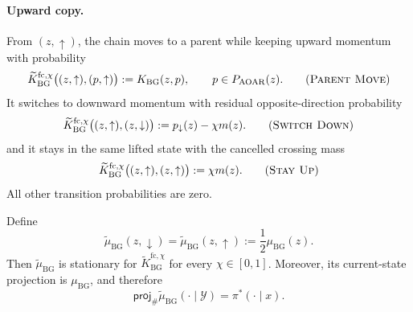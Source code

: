 \documentclass{article}
\numberwithin{theorem}{section}
\numberwithin{proposition}{section}
\numberwithin{corollary}{section}
\numberwithin{lemma}{section}
\numberwithin{conjecture}{section}
\numberwithin{remark}{section}
\numberwithin{definition}{section}
\numberwithin{assumption}{section}
\numberwithin{example}{section}
\newcommand{\calY}{{\mathcal{Y}}}
\begin{document}
\begin{definition}
\paragraph{Upward copy.}
From $(z,\uparrow)$, the chain moves to a parent while keeping upward momentum with probability
\begin{equation*}
    \widetilde K_{\mathrm{BG}}^{\mathrm{fc},\chi}
    \bigl((z,\uparrow),(p,\uparrow)\bigr)
    :=
    K_{\mathrm{BG}}(z,p),\qquad p\in P_{\mathrm{AOAR}}(z).
    \tag{\textsc{Parent Move}}
\end{equation*}
It switches to downward momentum with residual opposite-direction probability
\begin{equation*}
    \widetilde K_{\mathrm{BG}}^{\mathrm{fc},\chi}
    \bigl((z,\uparrow),(z,\downarrow)\bigr)
    :=
    p_{\downarrow}(z)-\chi m(z).
    \tag{\textsc{Switch Down}}
\end{equation*}
and it stays in the same lifted state with the cancelled crossing mass
\begin{equation*}
    \widetilde K_{\mathrm{BG}}^{\mathrm{fc},\chi}
    \bigl((z,\uparrow),(z,\uparrow)\bigr)
    :=
    \chi m(z).
    \tag{\textsc{Stay Up}}
\end{equation*}
All other transition probabilities are zero.
\end{definition}

\begin{theorem}
\label{thm:bg_aoar_momentum_stationarity}
Define
\begin{equation*}
    \widetilde\mu_{\mathrm{BG}}(z,\downarrow)
    =
    \widetilde\mu_{\mathrm{BG}}(z,\uparrow)
    :=
    \frac12\mu_{\mathrm{BG}}(z).
\end{equation*}
Then $\widetilde\mu_{\mathrm{BG}}$ is stationary for $\widetilde K_{\mathrm{BG}}^{\mathrm{fc},\chi}$ for every $\chi\in[0,1]$. Moreover, its current-state projection is $\mu_{\mathrm{BG}}$, and therefore
\begin{equation*}
    \textsf{proj}_{\#}\widetilde\mu_{\mathrm{BG}}(\cdot\mid\calY)
    =
    \pi^*(\cdot\mid x).
\end{equation*}
\end{theorem}
\end{document}

